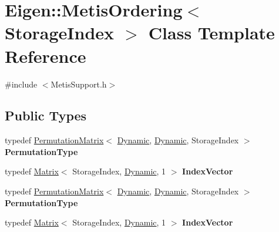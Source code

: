 \hypertarget{class_eigen_1_1_metis_ordering}{}\section{Eigen\+:\+:Metis\+Ordering$<$ Storage\+Index $>$ Class Template Reference}
\label{class_eigen_1_1_metis_ordering}


{\ttfamily \#include $<$Metis\+Support.\+h$>$}

\subsection*{Public Types}
\begin{DoxyCompactItemize}
\item 
\mbox{\label{class_eigen_1_1_metis_ordering_a23b6007ffa970edf2557c84279e22ce5}} 
typedef \hyperlink{group___core___module_class_eigen_1_1_permutation_matrix}{Permutation\+Matrix}$<$ \hyperlink{namespace_eigen_ad81fa7195215a0ce30017dfac309f0b2}{Dynamic}, \hyperlink{namespace_eigen_ad81fa7195215a0ce30017dfac309f0b2}{Dynamic}, Storage\+Index $>$ {\bfseries Permutation\+Type}
\item 
\mbox{\label{class_eigen_1_1_metis_ordering_af043ef38d59d1ff5a0fff6c297fbebcd}} 
typedef \hyperlink{group___core___module_class_eigen_1_1_matrix}{Matrix}$<$ Storage\+Index, \hyperlink{namespace_eigen_ad81fa7195215a0ce30017dfac309f0b2}{Dynamic}, 1 $>$ {\bfseries Index\+Vector}
\item 
\mbox{\label{class_eigen_1_1_metis_ordering_a23b6007ffa970edf2557c84279e22ce5}} 
typedef \hyperlink{group___core___module_class_eigen_1_1_permutation_matrix}{Permutation\+Matrix}$<$ \hyperlink{namespace_eigen_ad81fa7195215a0ce30017dfac309f0b2}{Dynamic}, \hyperlink{namespace_eigen_ad81fa7195215a0ce30017dfac309f0b2}{Dynamic}, Storage\+Index $>$ {\bfseries Permutation\+Type}
\item 
\mbox{\label{class_eigen_1_1_metis_ordering_af043ef38d59d1ff5a0fff6c297fbebcd}} 
typedef \hyperlink{group___core___module_class_eigen_1_1_matrix}{Matrix}$<$ Storage\+Index, \hyperlink{namespace_eigen_ad81fa7195215a0ce30017dfac309f0b2}{Dynamic}, 1 $>$ {\bfseries Index\+Vector}
\end{DoxyCompactItemize}
